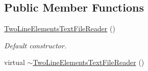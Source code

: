 \subsection*{Public Member Functions}
\begin{DoxyCompactItemize}
\item 
\hyperlink{classtudat_1_1input__output_1_1TwoLineElementsTextFileReader_ae8d60ba2b57f37bc74fb750c774f63c8}{Two\+Line\+Elements\+Text\+File\+Reader} ()
\begin{DoxyCompactList}\small\item\em Default constructor. \end{DoxyCompactList}\item 
virtual \hyperlink{classtudat_1_1input__output_1_1TwoLineElementsTextFileReader_acc4aaeef7ac208097a3e8cf45ddb2708}{$\sim$\+Two\+Line\+Elements\+Text\+File\+Reader} ()\hypertarget{classtudat_1_1input__output_1_1TwoLineElementsTextFileReader_acc4aaeef7ac208097a3e8cf45ddb2708}{}\label{classtudat_1_1input__output_1_1TwoLineElementsTextFileReader_acc4aaeef7ac208097a3e8cf45ddb2708}


\end{DoxyCompactItemize}
